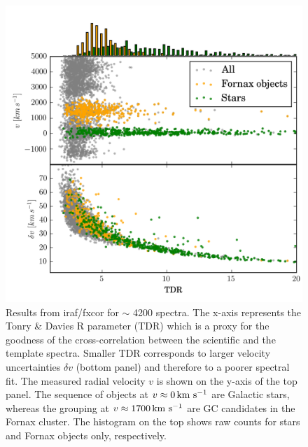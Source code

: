 \documentclass[useAMS,usenatbib]{mn2e}
\newcommand{\kms}{\mbox{\,km~s$^{-1}$}}
\begin{document}
\begin{figure}
\centering
\includegraphics[width=\columnwidth]{figures/fxcor_subplot.png} 
\caption{Results from iraf/fxcor for $\sim$ 4200 spectra. The x-axis represents the Tonry \& Davies R parameter (TDR) which is a proxy for the goodness of the cross-correlation between the scientific and the template spectra. Smaller TDR corresponds to larger velocity uncertainties $\delta v$ (bottom panel) and therefore to a poorer spectral fit. The measured radial velocity $v$ is shown on the y-axis of the top panel. The sequence of objects at $v\approx 0 \kms$ are Galactic stars, whereas the grouping at $v\approx1700\kms$ are GC candidates in the Fornax cluster. The histogram on the top shows raw counts for stars and Fornax objects only, respectively. }
\label{fig:tdr}
\end{figure}
\end{document}
